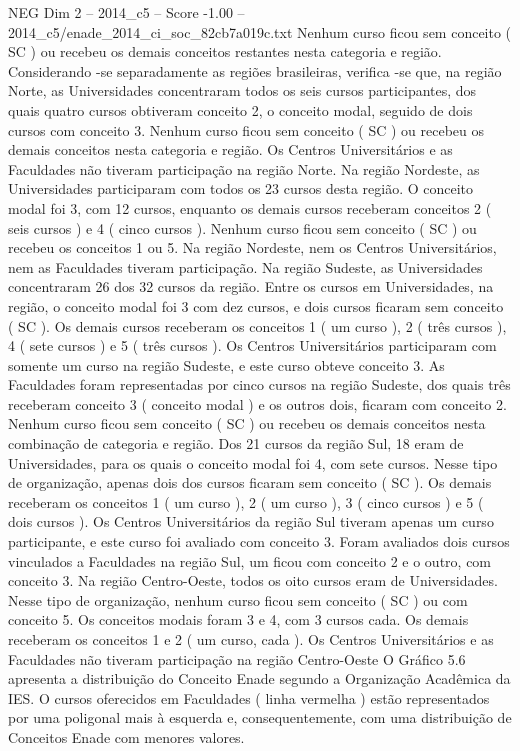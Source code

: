 \begin{textsample}{NEG Dim 2 – 2014\_c5 – Score -1.00 – 2014\_c5/enade\_2014\_ci\_soc\_82cb7a019c.txt}
Nenhum curso ficou sem conceito ( SC ) ou recebeu os demais conceitos restantes nesta categoria e região.
Considerando -se separadamente as regiões brasileiras, verifica -se que, na região Norte, as Universidades concentraram todos os seis cursos participantes, dos quais quatro cursos obtiveram conceito 2, o conceito modal, seguido de dois cursos com conceito 3.
Nenhum curso ficou sem conceito ( SC ) ou recebeu os demais conceitos nesta categoria e região.
Os Centros Universitários e as Faculdades não tiveram participação na região Norte.
Na região Nordeste, as Universidades participaram com todos os 23 cursos desta região.
O conceito modal foi 3, com 12 cursos, enquanto os demais cursos receberam conceitos 2 ( seis cursos ) e 4 ( cinco cursos ).
Nenhum curso ficou sem conceito ( SC ) ou recebeu os conceitos 1 ou 5.
Na região Nordeste, nem os Centros Universitários, nem as Faculdades tiveram participação.
Na região Sudeste, as Universidades concentraram 26 dos 32 cursos da região.
Entre os cursos em Universidades, na região, o conceito modal foi 3 com dez cursos, e dois cursos ficaram sem conceito ( SC ).
Os demais cursos receberam os conceitos 1 ( um curso ), 2 ( três cursos ), 4 ( sete cursos ) e 5 ( três cursos ).
Os Centros Universitários participaram com somente um curso na região Sudeste, e este curso obteve conceito 3.
As Faculdades foram representadas por cinco cursos na região Sudeste, dos quais três receberam conceito 3 ( conceito modal ) e os outros dois, ficaram com conceito 2.
Nenhum curso ficou sem conceito ( SC ) ou recebeu os demais conceitos nesta combinação de categoria e região.
Dos 21 cursos da região Sul, 18 eram de Universidades, para os quais o conceito modal foi 4, com sete cursos.
Nesse tipo de organização, apenas dois dos cursos ficaram sem conceito ( SC ).
Os demais receberam os conceitos 1 ( um curso ), 2 ( um curso ), 3 ( cinco cursos ) e 5 ( dois cursos ).
Os Centros Universitários da região Sul tiveram apenas um curso participante, e este curso foi avaliado com conceito 3.
Foram avaliados dois cursos vinculados a Faculdades na região Sul, um ficou com conceito 2 e o outro, com conceito 3.
Na região Centro-Oeste, todos os oito cursos eram de Universidades.
Nesse tipo de organização, nenhum curso ficou sem conceito ( SC ) ou com conceito 5.
Os conceitos modais foram 3 e 4, com 3 cursos cada.
Os demais receberam os conceitos 1 e 2 ( um curso, cada ).
Os Centros Universitários e as Faculdades não tiveram participação na região Centro-Oeste O Gráfico 5.6 apresenta a distribuição do Conceito Enade segundo a Organização Acadêmica da IES.
O cursos oferecidos em Faculdades ( linha vermelha ) estão representados por uma poligonal mais à esquerda e, consequentemente, com uma distribuição de Conceitos Enade com menores valores.

\end{textsample}

